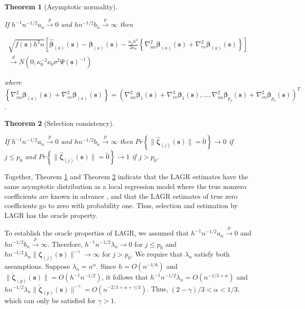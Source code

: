 \documentclass[authoryear,review, 12pt]{elsarticle}
\newtheorem{thm}{Theorem}
\begin{document}
\begin{thm}[Asymptotic normality]
\label{theorem:normality} 



If $h^{-1}n^{-1/2}a_{n}\xrightarrow{p}0$ and $hn^{-1/2}b_{n}\xrightarrow{p}\infty$
then

\begin{multline*}
\sqrt{f\left(\bm{s}\right)h^{2}n}\left[\hat{\bm{\beta}}_{\left(a\right)}\left(\bm{s}\right)-\bm{\beta}_{\left(a\right)}\left(\bm{s}\right)-\frac{\kappa_{2}h^{2}}{2\kappa_{0}}\left\{ \nabla_{uu}^{2}\bm{\beta}_{\left(a\right)}\left(\bm{s}\right)+\nabla_{vv}^{2}\bm{\beta}_{\left(a\right)}\left(\bm{s}\right)\right\} \right]\\
\xrightarrow{d}N\left(0,\kappa_{0}^{-2}\nu_{0}\sigma^{2}\Psi\left(\bm{s}\right)^{-1}\right)
\end{multline*}


where $\left\{ \nabla_{uu}^{2}\bm{\beta}_{\left(a\right)}\left(\bm{s}\right)+\nabla_{vv}^{2}\bm{\beta}_{\left(a\right)}\left(\bm{s}\right)\right\} =\left(\nabla_{uu}^{2}\bm{\beta}_{1}\left(\bm{s}\right)+\nabla_{vv}^{2}\bm{\beta}_{1}\left(\bm{s}\right),\dots,\nabla_{uu}^{2}\bm{\beta}_{p_{o}}\left(\bm{s}\right)+\nabla_{vv}^{2}\bm{\beta}_{p_{o}}\left(\bm{s}\right)\right)^{T}$.
\end{thm}

\begin{thm}[Selection consistency]
\label{theorem:selection}



If $h^{-1}n^{-1/2}a_{n}\xrightarrow{p}0$ and $hn^{-1/2}b_{n}\xrightarrow{p}\infty$
then $Pr\left\{ \|\hat{\bm{\zeta}}_{\left(j\right)}\left(\bm{s}\right)\|=\utilde{0}\right\} \to0$
if $j\le p_{0}$ and $Pr\left\{ \|\hat{\bm{\zeta}}_{\left(j\right)}\left(\bm{s}\right)\|=\utilde{0}\right\} \to1$
if $j>p_{0}$. 
\end{thm}
Together, Theorem \ref{theorem:normality} and Theorem \ref{theorem:selection}
indicate that the LAGR estimates have the same asymptotic distribution
as a local regression model where the true nonzero coefficients are
known in advance \citep{Sun-Yan-Zhang-Lu-2014}, and that the LAGR
estimates of true zero coefficients go to zero with probability one.
Thus, selection and estimation by LAGR has the oracle property.

To establish the oracle properties of LAGR, we assumed that $h^{-1}n^{-1/2}a_{n}\xrightarrow{p}0$
and $hn^{-1/2}b_{n}\xrightarrow{p}\infty$. Therefore, $h^{-1}n^{-1/2}\lambda_{n}\to0$
for $j\le p_{0}$ and $hn^{-1/2}\lambda_{n}\|\bm{\zeta}_{\left(j\right)}\left(\bm{s}\right)\|^{-\gamma}\to\infty$
for $j>p_{0}$. We require that $\lambda_{n}$ satisfy both assumptions.
Suppose $\lambda_{n}=n^{\alpha}$. Since $h=O\left(n^{-1/6}\right)$
and $\|\tilde{\bm{\zeta}}_{\left(p\right)}(\bm{s})\|=O\left(h^{-1}n^{-1/2}\right)$,
it follows that $h^{-1}n^{-1/2}\lambda_{n}=O\left(n^{-1/3+\alpha}\right)$
and $hn^{-1/2}\lambda_{n}\|\tilde{\bm{\zeta}}_{\left(p\right)}\left(\bm{s}\right)\|^{-\gamma}=O\left(n^{-2/3+\alpha+\gamma/3}\right)$.
Thus, $\left(2-\gamma\right)/3<\alpha<1/3$, which can only be satisfied
for $\gamma>1$.
\end{document}
